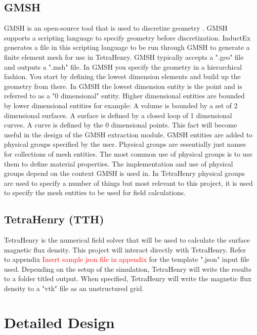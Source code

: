 \subsection{GMSH}
GMSH is an open-source tool that is used to discretize geometry \cite{GMSH}. GMSH supports a scripting language to specify geometry before discretization. InductEx generates a file in this scripting language to be run through GMSH to generate a finite element mesh for use in TetraHenry. GMSH typically accepts a ".geo" file and outputs a ".msh" file. In GMSH you specify the geometry in a hierarchical fashion. You start by defining the lowest dimension elements and build up the geometry from there. In GMSH the lowest dimension entity is the point and is referred to as a "0 dimensional" entity. Higher dimensional entities are bounded by lower dimensional entities for example: A volume is bounded by a set of 2 dimensional surfaces. A surface is defined by a closed loop of 1 dimensional curves. A curve is defined by the 0 dimensional points. This fact will become useful in the design of the GMSH extraction module. GMSH entities are added to physical groups specified by the user. Physical groups are essentially just names for collections of mesh entities. The most common use of physical groups is to use them to define material properties. The implementation and use of physical groups depend on the context GMSH is used in. In TetraHenry physical groups are used to specify a number of things but most relevant to this project, it is used to specify the mesh entities to be used for field calculations. 

\subsection{TetraHenry (TTH)}
TetraHenry is the numerical field solver that will be used to calculate the surface magnetic flux density. This project will interact directly with TetraHenry. Refer to appendix \textcolor{red}{Insert sample json file in appendix} for the template ".json" input file used. Depending on the setup of the simulation, TetraHenry will write the results to a folder titled output. When specified, TetraHenry will write the magnetic flux density to a "vtk" file as an unstructured grid. 

\section{Detailed Design}
